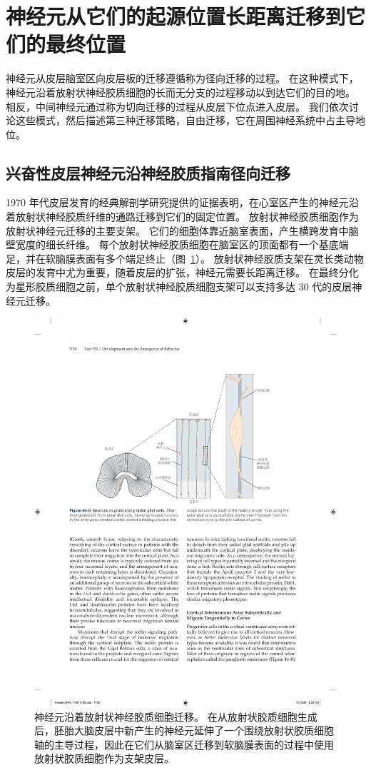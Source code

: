 \section{神经元从它们的起源位置长距离迁移到它们的最终位置}

神经元从皮层脑室区向皮层板的迁移遵循称为径向迁移的过程。
在这种模式下，神经元沿着放射状神经胶质细胞的长而无分支的过程移动以到达它们的目的地。
相反，中间神经元通过称为切向迁移的过程从皮层下位点进入皮层。
我们依次讨论这些模式，然后描述第三种迁移策略，自由迁移，它在周围神经系统中占主导地位。



\subsection{兴奋性皮层神经元沿神经胶质指南径向迁移}

1970 年代皮层发育的经典解剖学研究提供的证据表明，在心室区产生的神经元沿着放射状神经胶质纤维的通路迁移到它们的固定位置。
放射状神经胶质细胞作为放射状神经元迁移的主要支架。
它们的细胞体靠近脑室表面，产生横跨发育中脑壁宽度的细长纤维。
每个放射状神经胶质细胞在脑室区的顶面都有一个基底端足，并在软脑膜表面有多个端足终止（图~\ref{fig:46_6}）。
放射状神经胶质支架在灵长类动物皮层的发育中尤为重要，随着皮层的扩张，神经元需要长距离迁移。
在最终分化为星形胶质细胞之前，单个放射状神经胶质细胞支架可以支持多达 30 代的皮层神经元迁移。


\begin{figure}[htbp]
	\centering
	\includegraphics[width=0.6\linewidth]{chap46/fig_46_6}
	\caption{神经元沿着放射状神经胶质细胞迁移。
		在从放射状胶质细胞生成后，胚胎大脑皮层中新产生的神经元延伸了一个围绕放射状胶质细胞轴的主导过程，因此在它们从脑室区迁移到软脑膜表面的过程中使用放射状胶质细胞作为支架皮层。}
	\label{fig:46_6}
\end{figure}


